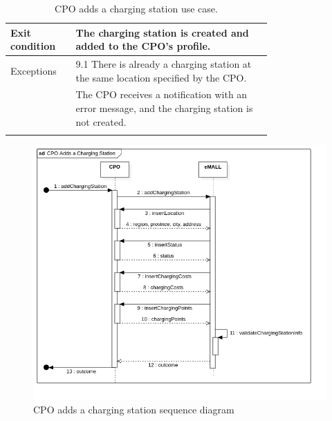 \begin{center}
\begin{longtable}{lp{0.75\linewidth}}
        \hline
        Exit condition   & The charging station is created and added to the CPO’s profile.                                           \\
        \hline
        Exceptions       & 9.1 There is already a charging station at the same location specified by the CPO.                        \\
        & The CPO receives a notification with an error message, and the charging station is not created.           \\
        \hline
        \caption{CPO adds a charging station use case.}
        \label{tab: CPO_adds_charging_station_use_case}
    \end{longtable}

    \begin{figure} [H]
        \begin{center}
            \includegraphics[width=0.9\linewidth]{Images/SequenceDiagrams/cpo_adds_a_charging_stations}
            \caption{CPO adds a charging station sequence diagram}
            \label{fig: cpo_adds_station_seq_diag}
        \end{center}
    \end{figure}
\end{center}

